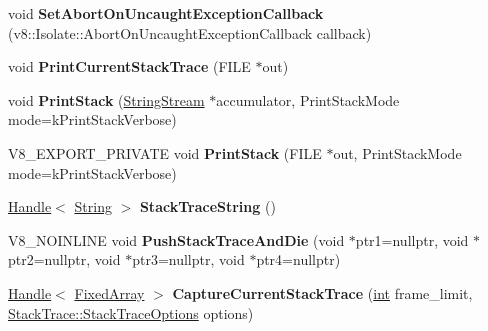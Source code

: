 \begin{DoxyCompactItemize}
\mbox{\label{classv8_1_1internal_1_1Isolate_af81d8aeb99dfbb28950ed1a51ec6b3f6}} 
void {\bfseries Set\+Abort\+On\+Uncaught\+Exception\+Callback} (v8\+::\+Isolate\+::\+Abort\+On\+Uncaught\+Exception\+Callback callback)
\item 
\mbox{\label{classv8_1_1internal_1_1Isolate_a2e087a2fe0e6578a42f02650507db595}} 
void {\bfseries Print\+Current\+Stack\+Trace} (F\+I\+LE $\ast$out)
\item 
\mbox{\label{classv8_1_1internal_1_1Isolate_a196bf9be1774a3e0d412bbefdfafb45b}} 
void {\bfseries Print\+Stack} (\mbox{\hyperlink{classv8_1_1internal_1_1StringStream}{String\+Stream}} $\ast$accumulator, Print\+Stack\+Mode mode=k\+Print\+Stack\+Verbose)
\item 
\mbox{\label{classv8_1_1internal_1_1Isolate_a1c9e54103ad742a589b6f1605a0b4667}} 
V8\+\_\+\+E\+X\+P\+O\+R\+T\+\_\+\+P\+R\+I\+V\+A\+TE void {\bfseries Print\+Stack} (F\+I\+LE $\ast$out, Print\+Stack\+Mode mode=k\+Print\+Stack\+Verbose)
\item 
\mbox{\label{classv8_1_1internal_1_1Isolate_a6dcfa7a6999e4785cba91f25d2df7433}} 
\mbox{\hyperlink{classv8_1_1internal_1_1Handle}{Handle}}$<$ \mbox{\hyperlink{classv8_1_1internal_1_1String}{String}} $>$ {\bfseries Stack\+Trace\+String} ()
\item 
\mbox{\label{classv8_1_1internal_1_1Isolate_acd9f55e3b97290a7666d3541c74ddcb9}} 
V8\+\_\+\+N\+O\+I\+N\+L\+I\+NE void {\bfseries Push\+Stack\+Trace\+And\+Die} (void $\ast$ptr1=nullptr, void $\ast$ptr2=nullptr, void $\ast$ptr3=nullptr, void $\ast$ptr4=nullptr)
\item 
\mbox{\label{classv8_1_1internal_1_1Isolate_a8db2c8b0ecf5edb91ec0e06f8e5158dd}} 
\mbox{\hyperlink{classv8_1_1internal_1_1Handle}{Handle}}$<$ \mbox{\hyperlink{classv8_1_1internal_1_1FixedArray}{Fixed\+Array}} $>$ {\bfseries Capture\+Current\+Stack\+Trace} (\mbox{\hyperlink{classint}{int}} frame\+\_\+limit, \mbox{\hyperlink{classv8_1_1StackTrace_a9704e4a37949eb8eb8ccddbddf161492}{Stack\+Trace\+::\+Stack\+Trace\+Options}} options)

\end{DoxyCompactItemize}
